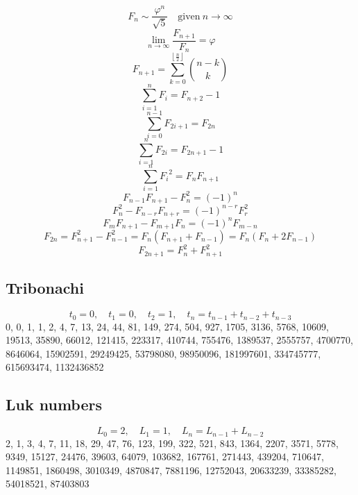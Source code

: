 \documentclass[11.5pt,a4paper,landscape,oneside]{amsart}
\newcommand{\Sequence}[1]{\subsection{#1}}
\begin{document}
\begin{multicols*}{2}
\begin{equation}
		F_n\sim\frac{\varphi^n}{\sqrt{5}}\quad\text{given}\ n\to\infty
	\end{equation}
	\begin{equation}
		\lim_{n\to\infty}\frac{F_{n+1}}{F_n}=\varphi
	\end{equation}
	\begin{equation}
		F_{n+1}=\sum_{k=0}^{\left\lfloor\frac{n}{2}\right\rfloor} \binom{n-k}{k}
	\end{equation}
	\begin{equation}
		\sum_{i=1}^n F_i = F_{n+2} - 1
	\end{equation}
	\begin{equation}
		\sum_{i=0}^{n-1} F_{2i+1} = F_{2n}
	\end{equation}
	\begin{equation}
		\sum_{i=1}^{n} F_{2i} = F_{2n+1}-1
	\end{equation}
	\begin{equation}
		\sum_{i=1}^n {F_i}^2 = F_{n} F_{n+1}
	\end{equation}
	\begin{equation}
		F_{n-1}F_{n+1} - F_n^2 = (-1)^n
	\end{equation}
	\begin{equation}
		F_n^2 - F_{n-r}F_{n+r} = (-1)^{n-r}F_r^2
	\end{equation}
	\begin{equation}
		F_m F_{n+1} - F_{m+1} F_n = (-1)^n F_{m-n}
	\end{equation}
	\begin{equation}
		F_{2n} = F_{n+1}^2 - F_{n-1}^2 = F_n \left(F_{n+1}+F_{n-1}\right) = F_n \left(F_{n}+2F_{n-1}\right)
	\end{equation}
	\begin{equation}
		F_{2n+1} = F_{n}^2 + F_{n+1}^2
	\end{equation}
	\Sequence{Tribonachi}
	\begin{equation}
		t_0=0,\quad t_1=0,\quad t_2=1,\quad t_{n}=t_{n-1}+t_{n-2}+t_{n-3}
	\end{equation}
	0, 0, 1, 1, 2, 4, 7, 13, 24, 44, 81, 149, 274, 504, 927, 1705, 3136, 5768, 10609, 19513, 35890, 66012, 121415, 223317, 410744, 755476, 1389537, 2555757, 4700770, 8646064, 15902591, 29249425, 53798080, 98950096, 181997601, 334745777, 615693474, 1132436852
	\Sequence{Luk numbers}
	\begin{equation}
		L_0=2,\quad L_1=1,\quad L_{n}=L_{n-1}+L_{n-2}
	\end{equation}
	2, 1, 3, 4, 7, 11, 18, 29, 47, 76, 123, 199, 322, 521, 843, 1364, 2207, 3571, 5778, 9349, 15127, 24476, 39603, 64079, 103682, 167761, 271443, 439204, 710647, 1149851, 1860498, 3010349, 4870847, 7881196, 12752043, 20633239, 33385282, 54018521, 87403803

\end{multicols*}
\end{document}
